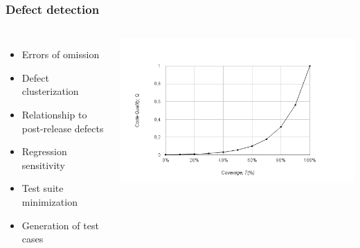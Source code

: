 \documentclass{beamer}
\begin{document}
\begin{frame}
  \frametitle{Defect detection}
\begin{columns}[T]
	\begin{itemize}
		\item Errors of omission
		\item Defect clusterization
		\item Relationship to post-release defects
		\item Regression sensitivity
		\item Test suite minimization
		\item Generation of test cases
	\end{itemize}
	\includegraphics[scale=0.4]{coverage_vs_code_quality_chart.png}
\end{columns}
\end{frame}
\end{document}
